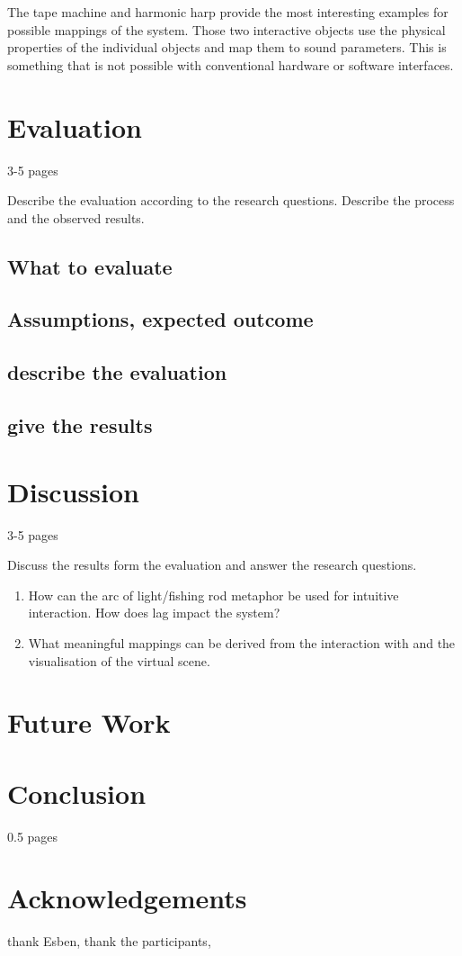 \documentclass[10pt,a4paper]{scrartcl}
\begin{document}
The tape machine and harmonic harp provide the most interesting examples for possible mappings of the system. Those two interactive objects use the physical properties of the individual objects and map them to sound parameters. This is something that is not possible with conventional hardware or software interfaces.





\section{Evaluation}
\label{sec:evaluation}
3-5 pages

Describe the evaluation according to the research questions. Describe the process and the observed results.

\subsection{What to evaluate}
\subsection{Assumptions, expected outcome}
\subsection{describe the evaluation}
\subsection{give the results}


\section{Discussion}
\label{sec:discussion}
3-5 pages

Discuss the results form the evaluation and answer the research questions. 

\begin{enumerate}
\item How can the arc of light/fishing rod metaphor be used for intuitive interaction. How does lag impact the system?
\item What meaningful mappings can be derived from the interaction with and the visualisation of the virtual scene.
\end{enumerate}

\section{Future Work}

\section{Conclusion}
0.5 pages

\section{Acknowledgements}
thank Esben, thank the participants,






\end{document}

